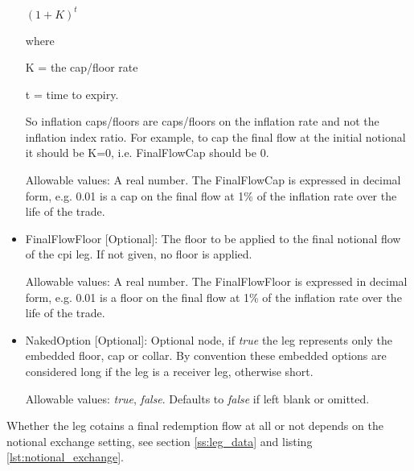 \begin{itemize}
$
(1+K)^t
$

 where

K = the cap/floor rate

t = time to expiry.

So inflation caps/floors are caps/floors on the inflation rate and not the inflation index ratio. For example, to cap the final flow at the initial notional  it should be K=0, i.e. FinalFlowCap should be 0.  


Allowable values: A real number. The FinalFlowCap is expressed in decimal form, e.g. 0.01 is a cap on the final flow at 1\% of the inflation rate over the life of the trade.


\item FinalFlowFloor [Optional]: The floor to be applied to the final notional flow of the cpi leg. If not given, no floor
  is applied.


Allowable values: A real number. The FinalFlowFloor is expressed in decimal form, e.g. 0.01 is a floor on the final flow at 1\% of the inflation rate over the life of the trade.

\item NakedOption [Optional]: Optional node, if \emph{true} the leg represents only the embedded floor, cap or collar. 
By convention these embedded options are considered long if the leg is a receiver leg, otherwise short. 
 
 Allowable values:  \emph{true}, \emph{false}. Defaults to \emph{false} if left blank or omitted.
 
\end{itemize} 

Whether the leg cotains a final redemption flow at all or not depends on the
 notional exchange setting, see section \ref{ss:leg_data} and listing \ref{lst:notional_exchange}.

